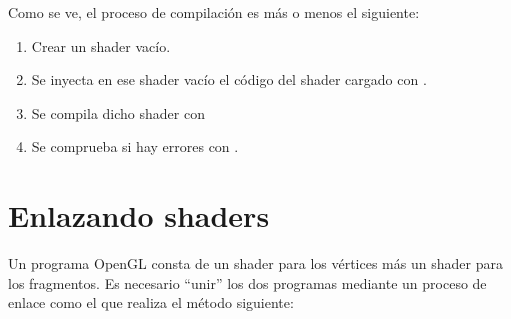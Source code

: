 \documentclass[a4paper,12pt,spanish]{sphinxmanual}
\begin{document}
Como se ve, el proceso de compilación es más o menos el siguiente:
\begin{enumerate}
\item {} 
Crear un shader vacío.

\item {} 
Se inyecta en ese shader vacío el código del shader cargado con .

\item {} 
Se compila dicho shader con 

\item {} 
Se comprueba si hay errores con .

\end{enumerate}


\section{Enlazando shaders}
\label{cap3opengl:enlazando-shaders}
Un programa OpenGL consta de un shader para los vértices más un shader para los fragmentos. Es necesario ``unir'' los dos programas mediante un proceso de enlace como el que realiza el método siguiente:
\end{document}
